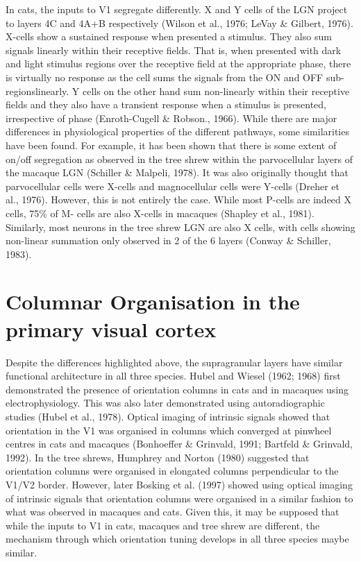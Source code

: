 In cats, the inputs to V1 segregate differently. X and Y cells of the LGN project to layers 4C and 4A+B respectively (Wilson et al., 1976; LeVay \& Gilbert, 1976). X-cells show a sustained response when presented a stimulus. They also sum signals linearly within their receptive fields. That is, when presented with dark and light stimulus regions over the receptive field at the appropriate phase, there is virtually no response as the cell sums the signals from the ON and OFF sub-regionslinearly. Y cells on the other hand sum non-linearly within their receptive fields and they also have a transient response when a stimulus is presented, irrespective of phase (Enroth-Cugell \& Robson., 1966).
While there are major differences in physiological properties of the different pathways, some similarities have been found. For example, it has been shown that there is some extent of on/off segregation as observed in the tree shrew within the parvocellular layers of the macaque LGN (Schiller \& Malpeli, 1978). It was also originally thought that parvocellular cells were X-cells and magnocellular cells were Y-cells (Dreher et al., 1976). However, this is not entirely the case. While most P-cells are indeed X cells, 75\% of M- cells are also X-cells in macaques (Shapley et al., 1981). Similarly, most neurons in the tree shrew LGN are also X cells, with cells showing non-linear summation only observed in 2 of the 6 layers (Conway \& Schiller, 1983).

\section{Columnar Organisation in the primary visual cortex}
Despite the differences highlighted above, the supragranular layers have similar functional architecture in all three species. Hubel and Wiesel (1962; 1968) first demonstrated the presence of orientation columns in cats and in macaques using electrophysiology. This was also later demonstrated using autoradiographic studies (Hubel et al., 1978). Optical imaging of intrinsic signals showed that orientation in the V1 was organised in columns which converged at pinwheel centres in cats and macaques (Bonhoeffer \& Grinvald, 1991; Bartfeld \& Grinvald, 1992). In the tree shrews, Humphrey and Norton (1980) suggested that orientation columns were organised in elongated columns perpendicular to the V1/V2 border. However, later Bosking et al. (1997) showed using optical imaging of intrinsic signals that orientation columns were organised in a similar fashion to what was observed in macaques and cats. Given this, it may be supposed that while the inputs to V1 in cats, macaques and tree shrew are different, the mechanism through which orientation tuning develops in all three species maybe similar. 


